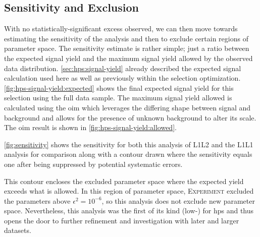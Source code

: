 \subsection{Sensitivity and Exclusion}
With no statistically-significant excess observed, we can then move towards estimating the sensitivity of
the analysis and then to exclude certain regions of parameter space.
The sensitivity estimate is rather simple; just a ratio between the expected signal yield
and the maximum signal yield allowed by the observed data distribution.
\cref{sec:hps:signal-yield} already described the expected signal calculation used here
as well as previously within the selection optimization.
\cref{fig:hps-signal-yield:expected} shows the final expected signal yield for this selection
using the full data sample.
The maximum signal yield allowed is calculated using the \ac{oim} \cite{yellin-oim:2002}
which leverages the differing shape between signal and background and allows for the presence
of unknown background to alter its scale.
The \ac{oim} result is shown in \cref{fig:hps-signal-yield:allowed}.

\cref{fig:sensitivity} shows the sensitivity for both this analysis of L1L2 and the L1L1 analysis
for comparison along with a contour drawn where the sensitivity equals one after being suppressed
by potential systematic errors.

This contour encloses the excluded parameter space where the expected yield exceeds what is allowed.
In this region of parameter space, \textsc{Experiment}
excluded the parameters above $\epsilon^2 = 10^{-6}$, so this analysis does not exclude new parameter space.
Nevertheless, this analysis was the first of its kind (low-\Psum) for \ac{hps} and thus
opens the door to further refinement and investigation with later and larger datasets.

